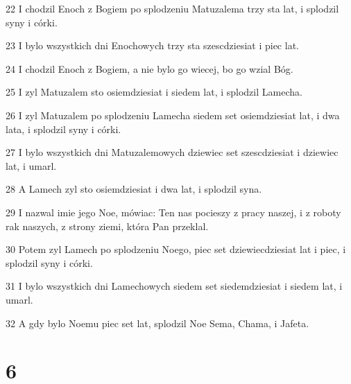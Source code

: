 \par 22 I chodzil Enoch z Bogiem po splodzeniu Matuzalema trzy sta lat, i splodzil syny i córki.
\par 23 I bylo wszystkich dni Enochowych trzy sta szescdziesiat i piec lat.
\par 24 I chodzil Enoch z Bogiem, a nie bylo go wiecej, bo go wzial Bóg.
\par 25 I zyl Matuzalem sto osiemdziesiat i siedem lat, i splodzil Lamecha.
\par 26 I zyl Matuzalem po splodzeniu Lamecha siedem set osiemdziesiat lat, i dwa lata, i splodzil syny i córki.
\par 27 I bylo wszystkich dni Matuzalemowych dziewiec set szescdziesiat i dziewiec lat, i umarl.
\par 28 A Lamech zyl sto osiemdziesiat i dwa lat, i splodzil syna.
\par 29 I nazwal imie jego Noe, mówiac: Ten nas pocieszy z pracy naszej, i z roboty rak naszych, z strony ziemi, która Pan przeklal.
\par 30 Potem zyl Lamech po splodzeniu Noego, piec set dziewiecdziesiat lat i piec, i splodzil syny i córki.
\par 31 I bylo wszystkich dni Lamechowych siedem set siedemdziesiat i siedem lat, i umarl.
\par 32 A gdy bylo Noemu piec set lat, splodzil Noe Sema, Chama, i Jafeta.

\chapter{6}

